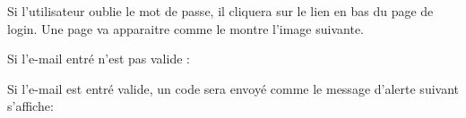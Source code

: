 \documentclass{article}
\begin{document}
\begin{enumerate}
\vspace{3.4cm}
	Si l'utilisateur oublie le mot de passe, il cliquera sur le lien en bas du page de login. Une page va apparaitre comme le montre l'image suivante.

\vspace{0.4cm}
\hspace*{-0.7in}
               \noindent{}


Si l'e-mail entré n'est pas valide :


\vspace{0.4cm}
\hspace*{-0.7in}
               \noindent{}



Si l'e-mail est entré valide, un code sera envoyé comme le message d'alerte suivant s'affiche:

\vspace{0.4cm}
\hspace*{-0.7in}
               \noindent{}


\end{enumerate}
\end{document}
